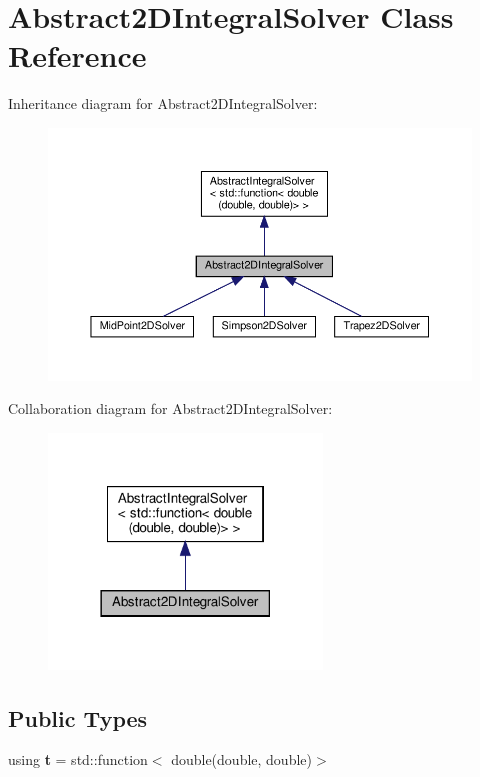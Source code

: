 \hypertarget{class_abstract2_d_integral_solver}{}\section{Abstract2\+D\+Integral\+Solver Class Reference}
\label{class_abstract2_d_integral_solver}


Inheritance diagram for Abstract2\+D\+Integral\+Solver\+:
\nopagebreak
\begin{figure}[H]
\begin{center}
\leavevmode
\includegraphics[width=350pt]{class_abstract2_d_integral_solver__inherit__graph}
\end{center}
\end{figure}


Collaboration diagram for Abstract2\+D\+Integral\+Solver\+:
\nopagebreak
\begin{figure}[H]
\begin{center}
\leavevmode
\includegraphics[width=206pt]{class_abstract2_d_integral_solver__coll__graph}
\end{center}
\end{figure}
\subsection*{Public Types}
\begin{DoxyCompactItemize}
\item 
\mbox{\label{class_abstract2_d_integral_solver_ab660df32953c6b0f9f3a45a8720eaeb3}} 
using {\bfseries t} = std\+::function$<$ double(double, double)$>$
\end{DoxyCompactItemize}
